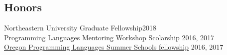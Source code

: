 \documentclass[margin,line]{resume}
\newcommand\mymedskip{10pt}
\begin{document}
\begin{resume}
    

    \renewcommand\mymedskip{3pt}




    \section{\mysidestyle Honors} 
    Northeastern University Graduate Fellowship\hfill 2018\\[\mymedskip]
    \href{https://www.sigplan.org/Conferences/PLMW/}{Programming Languages Mentoring Workshop Scolarship} \hfill 2016, 2017\\[\mymedskip]
    \href{https://www.cs.uoregon.edu/research/summerschool/summer17}{Oregon Programming Languages Summer Schools fellowship} \hfill %
    2016, 2017
    
    



\end{resume}
\end{document}
